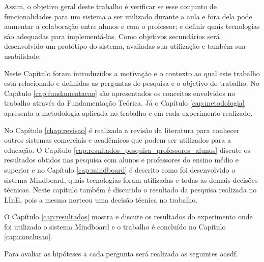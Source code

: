 Assim, o objetivo geral deste trabalho é verificar se esse conjunto de funcionalidades para um sistema a ser utilizado durante a aula e fora dela pode aumentar a colaboração entre alunos e com o professor; e definir quais tecnologias são adequadas para implementá-las. Como objetivos secundários será desenvolvido um protótipo do sistema, avaliadas sua utilização e também sua usabilidade.


Neste Capítulo foram introduzidos a motivação e o contexto ao qual este trabalho está relacionado e definidas as perguntas de pesquisa e o objetivo do trabalho. No Capítulo \ref{cap:fundamentacao} são apresentados os conceitos envolvidos no trabalho através da Fundamentação Teórica. Já o Capítulo \ref{cap:metodologia} apresenta a metodologia aplicada no trabalho e em cada experimento realizado. 

No Capítulo \ref{chap:revisao} é realizada a revisão da literatura para conhecer outros sistemas comerciais e acadêmicos que podem ser utilizados para a educação. O Capítulo \ref{cap:resultados_pesquisa_professores_alunos} discute os resultados obtidos nas pesquisa com alunos e professores do ensino médio e superior e no Capítulo \ref{cap:mindboard} é descrito como foi desenvolvido o sistema Mindboard, quais tecnologias foram utilizadas e todas as demais decisões técnicas. Neste capítulo também é discutido o resultado da pesquisa realizada no LInE, pois a mesma norteou uma decisão técnica no trabalho.

O Capítulo \ref{cap:resultados} mostra e discute os resultados do experimento onde foi utilizado o sistema Mindboard e o trabalho é concluído no Capítulo \ref{cap:conclusao}.

\iffalse

Para avaliar as hipóteses a cada pergunta será realizada as seguintes aasdf.




